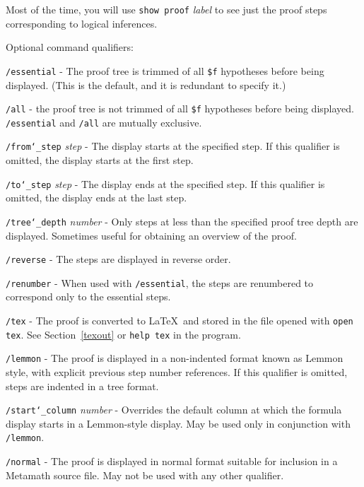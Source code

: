 Most of the time, you will use
    \texttt{show proof} {\em label}
to see just the proof steps corresponding to logical inferences.

Optional command qualifiers:

    \texttt{/essential} - The proof tree is trimmed of all
        \texttt{\$f} hypotheses before
        being displayed.  (This is the default, and it is redundant to
        specify it.)

    \texttt{/all} - the proof tree is not trimmed of all \texttt{\$f} hypotheses before
        being displayed.  \texttt{/essential} and \texttt{/all} are mutually exclusive.

    \texttt{/from{\char`\_}step} {\em step} - The display starts at the specified
        step.  If
        this qualifier is omitted, the display starts at the first step.

    \texttt{/to{\char`\_}step} {\em step} - The display ends at the specified
        step.  If this
        qualifier is omitted, the display ends at the last step.

    \texttt{/tree{\char`\_}depth} {\em number} - Only
         steps at less than the specified proof
        tree depth are displayed.  Sometimes useful for obtaining an overview of
        the proof.

    \texttt{/reverse} - The steps are displayed in reverse order.

    \texttt{/renumber} - When used with \texttt{/essential}, the steps are renumbered
        to correspond only to the essential steps.

    \texttt{/tex} - The proof is converted to \LaTeX\ and
        stored in the file opened
        with \texttt{open tex}.  See Section~\ref{texout} or
        \texttt{help tex} in the program.

    \texttt{/lemmon} - The proof is displayed in a non-indented format known
        as Lemmon style, with explicit previous step number references.
        If this qualifier is omitted, steps are indented in a tree format.

    \texttt{/start{\char`\_}column} {\em number} - Overrides the default column
        at which the formula display starts in a Lemmon-style display.  May be
        used only in conjunction with \texttt{/lemmon}.

    \texttt{/normal} - The proof is displayed in normal format suitable for
        inclusion in a Metamath source file.  May not be used with any other
        qualifier.


